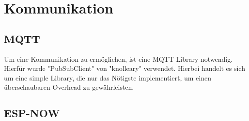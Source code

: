 \section{Kommunikation}
    \subsection{MQTT}
        Um eine Kommunikation zu ermöglichen, ist eine 
        MQTT-Library notwendig. Hierfür wurde "PubSubClient" von 
        "knolleary" verwendet. Hierbei handelt es sich um eine 
        simple Library, die nur das Nötigste implementiert, um
        einen überschaubaren Overhead zu gewährleisten.
    \subsection{ESP-NOW}